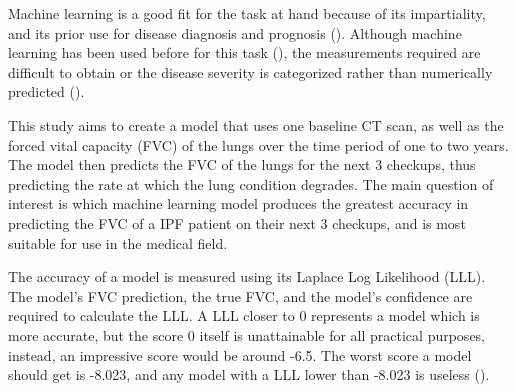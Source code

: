 \documentclass[12pt]{article}
\begin{document}
Machine learning is a good fit for the task at hand because of its impartiality, and its prior use for disease diagnosis and prognosis (\cite{wang2010high}). 
Although machine learning has been used before for this task (\cite{robbie2017evaluating,du20146,maldonado2014automated}), the measurements required are difficult to obtain or the disease severity is categorized rather than numerically predicted (\cite{walsh2018deep}).





This study aims to create a model that uses one baseline CT scan, as well as the forced vital capacity (FVC) of the lungs over the time period of one to two years.
The model then predicts the FVC of the lungs for the next 3 checkups, thus predicting the rate at which the lung condition degrades. 
The main question of interest is which machine learning model produces the greatest accuracy in predicting the FVC of a IPF patient on their next 3 checkups, and is most suitable for use in the medical field.

The accuracy of a model is measured using its Laplace Log Likelihood (LLL).
The model's FVC prediction, the true FVC, and the model's confidence are required to calculate the LLL. 
A LLL closer to 0 represents a model which is more accurate, but the score 0 itself is unattainable for all practical purposes, instead, an impressive score would be around -6.5.
The worst score a model should get is -8.023, and any model with a LLL lower than -8.023 is useless (\cite{laplaceloglikelihood}).
\end{document}
